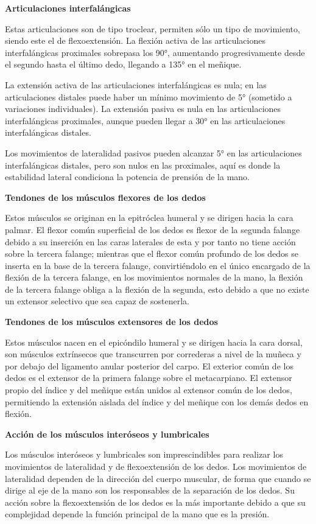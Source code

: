 \documentclass{article}
\begin{document}
\textbf{Articulaciones interfalángicas}

Estas articulaciones son de tipo troclear, permiten sólo un tipo de movimiento, siendo este el de flexoextensión. La flexión activa de las articulaciones interfalángicas proximales sobrepasa los 90°, aumentando progresivamente desde el segundo hasta el último dedo, llegando a 135° en el meñique.

La extensión activa de las articulaciones interfalángicas es nula; en las articulaciones distales puede haber un mínimo movimiento de 5° (sometido a variaciones individuales). La extensión pasiva es nula en las articulaciones interfalángicas proximales, aunque pueden llegar a 30° en las articulaciones interfalángicas distales.

Los movimientos de lateralidad pasivos pueden alcanzar 5° en las articulaciones interfalángicas distales, pero son nulos en las proximales, aquí es donde la estabilidad lateral condiciona la potencia de prensión de la mano.

\textbf{Tendones de los músculos flexores de los dedos}

Estos músculos se originan en la epitróclea humeral y se dirigen hacia la cara palmar. El flexor común superficial de los dedos es flexor de la segunda falange debido a su inserción en las caras laterales de esta y por tanto no tiene acción sobre la tercera falange; mientras que el flexor común profundo de los dedos se inserta en la base de la tercera falange, convirtiéndolo en el único encargado de la flexión de la tercera falange, en los movimientos normales de la mano, la flexión de la tercera falange obliga a la flexión de la segunda, esto debido a que no existe un extensor selectivo que sea capaz de sostenerla.

\textbf{Tendones de los músculos extensores de los dedos}

Estos músculos nacen en el epicóndilo humeral y se dirigen hacia la cara dorsal, son músculos extrínsecos que transcurren por correderas a nivel de la muñeca y por debajo del ligamento anular posterior del carpo. El exterior común de los dedos es el extensor de la primera falange sobre el metacarpiano.
El extensor propio del índice y del meñique están unidos al extensor común de los dedos, permitiendo la extensión aislada del índice y del meñique con los demás dedos en flexión.

\textbf{Acción de los músculos interóseos y lumbricales}

Los músculos interóseos y lumbricales son imprescindibles para realizar los movimientos de lateralidad y de flexoextensión de los dedos. Los movimientos de lateralidad dependen de la dirección del cuerpo muscular, de forma que cuando se dirige al eje de la mano son los responsables de la separación de los dedos. Su acción sobre la flexoextensión de los dedos es la más importante debido a que su complejidad depende la función principal de la mano que es la presión. 
\end{document}
